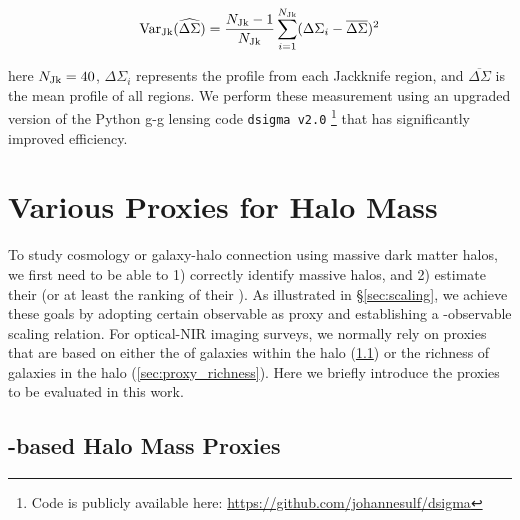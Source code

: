 \documentclass[fleqn,usenatbib,useAMS,english]{mnras}
\begin{document}
    \begin{equation}
        \mathrm{Var}_{\rm Jk}(\widehat{\Delta\Sigma}) = \frac{N_{\rm Jk} - 1}{N_{\rm Jk}} \sum\limits_{i=1}^{N_{\rm Jk}} (\Delta\Sigma_{i} - \overline{\Delta\Sigma})^2
    \end{equation}

    \noindent here $N_{\rm Jk}=40$, $\Delta\Sigma_{i}$ represents the \dsigma{} profile from each
    Jackknife region, and $\overline{\Delta\Sigma}$ is the mean profile of all regions.
    We perform these measurement using an upgraded version of the Python g-g lensing code
    \texttt{dsigma v2.0}
    \footnote{Code is publicly available here: \url{https://github.com/johannesulf/dsigma}}
    that has significantly improved efficiency.



\section{Various Proxies for Halo Mass}
    \label{sec:proxies}

    To study cosmology or galaxy-halo connection using massive dark matter halos, we first
    need to be able to 1) correctly identify massive halos, and 2) estimate their \mvir{}
    (or at least the ranking of their \mvir{}).
    As illustrated in \S \ref{sec:scaling}, we achieve these goals by adopting certain observable
    as \mvir{} proxy and establishing a \mvir{}-observable scaling relation.
    For optical-NIR imaging surveys, we normally rely on \mvir{} proxies that are based on
    either the \mstar{} of galaxies within the halo (\ref{sec:proxy_mstar}) or the richness of
    galaxies in the halo (\ref{sec:proxy_richness}).
    Here we briefly introduce the \mvir{} proxies to be evaluated in this work.

\subsection{\mstar{}-based Halo Mass Proxies}
    \label{sec:proxy_mstar}
\end{document}
